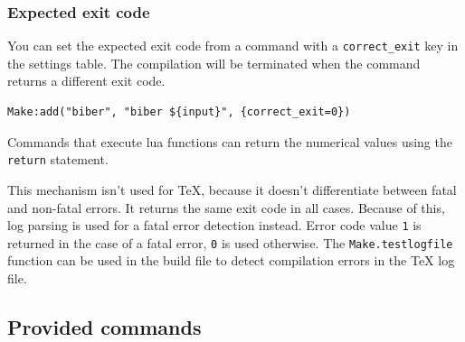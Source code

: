 \subsubsection{Expected exit code}\label{expected-exit-code}

You can set the expected exit code from a command with a
\texttt{correct\_exit} key in the settings table. The compilation will
be terminated when the command returns a different exit code.

\begin{verbatim}
Make:add("biber", "biber ${input}", {correct_exit=0})
\end{verbatim}

Commands that execute lua functions can return the numerical values
using the \texttt{return} statement.

This mechanism isn't used for \TeX, because it doesn't differentiate
between fatal and non-fatal errors. It returns the same exit code in all
cases. Because of this, log parsing is used for a fatal error detection
instead. Error code value \texttt{1} is returned in the case of a fatal
error, \texttt{0} is used otherwise. The \texttt{Make.testlogfile}
function can be used in the build file to detect compilation errors in
the TeX log file.

\subsection{Provided commands}\label{provided-commands}

